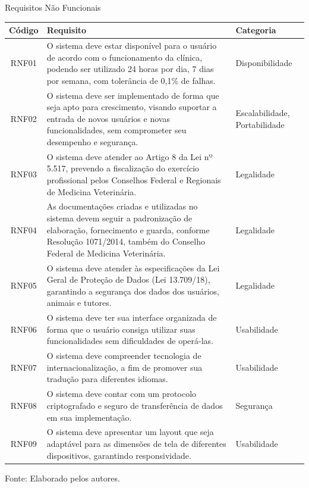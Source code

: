 \documentclass[
    12pt,               %
    openright,          %
    oneside,
    a4paper,            %
    BIBLATEX,           %
    TODO,               %
    english,            %
    brazil              %
    ]{ifsp-spo-inf-ctds}
\begin{document}
            \begin{center}
                \begin{quadro}[h]
                  \caption{Requisitos Não Funcionais}
                \begin{tabulary}{1.0\textwidth}{|C|p{25em}|p{7em}|}
                \hline
                Código & Requisito & Categoria\\
                \hline
                RNF01 & O sistema deve estar disponível para o usuário de acordo com o funcionamento da clínica, podendo ser utilizado 24 horas por dia, 7 dias por semana, com tolerância de 0,1\% de falhas. & Disponibilidade\\
                \hline
                RNF02 & O sistema deve ser implementado de forma que seja apto para crescimento, visando suportar a entrada de novos usuários e novas funcionalidades, sem comprometer seu desempenho e segurança. & Escalabilidade, Portabilidade\\
                \hline
                RNF03 & O sistema deve atender ao Artigo 8 da Lei nº 5.517, prevendo a fiscalização do exercício profissional pelos Conselhos Federal e Regionais de Medicina Veterinária. & Legalidade\\
                \hline
                RNF04 & As documentações criadas e utilizadas no sistema devem seguir a padronização de elaboração, fornecimento e guarda, conforme Resolução 1071/2014, também do Conselho Federal de Medicina Veterinária. & Legalidade\\
                \hline
                RNF05 & O sistema deve atender às especificações da Lei Geral de Proteção de Dados (Lei 13.709/18), garantindo a segurança dos dados dos usuários, animais e tutores. & Legalidade\\
                \hline
                RNF06 & O sistema deve ter sua interface organizada de forma que o usuário consiga utilizar suas funcionalidades sem dificuldades de operá-las. & Usabilidade\\
                \hline
                RNF07 & O sistema deve compreender tecnologia de internacionalização, a fim de promover sua tradução para diferentes idiomas. & Usabilidade\\
                \hline
                RNF08 & O sistema deve contar com um protocolo criptografado e seguro de transferência de dados em sua implementação. & Segurança\\
                \hline
                RNF09 & O sistema deve apresentar um layout que seja adaptável para as dimensões de tela de diferentes dispositivos, garantindo responsividade. & Usabilidade\\
                \hline
                \end{tabulary}
                \label{tab:req_nfunc}
                \centering

               \footnotesize Fonte: Elaborado pelos autores.
                \end{quadro}
            \end{center}
\end{document}
